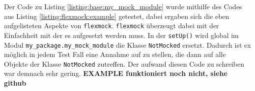 Der Code zu Listing \ref{listing:base:my_mock_module} wurde mithilfe des Codes aus Listing
\ref{listing:flexmock:example} getestet, dabei ergaben sich die eben aufgelisteten Aspekte von 
\lstinline{flexmock}. \lstinline{flexmock} überzeugt dabei mit der Einfachheit
mit der es aufgesetzt werden muss. In der \lstinline{setUp()} wird global im Modul
\lstinline{my_package.my_mock_module} die Klasse \lstinline{NotMocked} ersetzt. Dadurch ist
ex möglich in jedem Test Fall eine Annahme auf zu stellen, die dann auf alle Objekte
der Klasse \lstinline{NotMocked} zutreffen. Der aufwand diesen Code zu schreiben war demnach
sehr gering.
\textbf{EXAMPLE funktioniert noch nicht, siehe github}